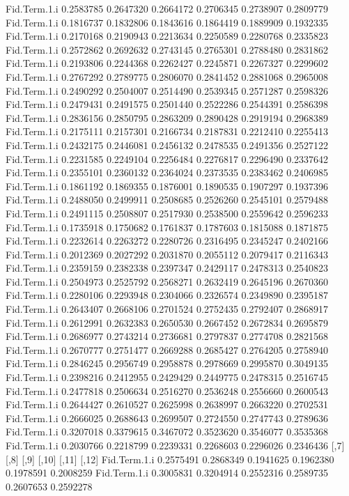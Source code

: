 \documentclass[11pt]{article} %
\begin{document}
\begin{Schunk}
\begin{Soutput}
Fid.Term.1.i 0.2583785 0.2647320 0.2664172 0.2706345 0.2738907 0.2809779
Fid.Term.1.i 0.1816737 0.1832806 0.1843616 0.1864419 0.1889909 0.1932335
Fid.Term.1.i 0.2170168 0.2190943 0.2213634 0.2250589 0.2280768 0.2335823
Fid.Term.1.i 0.2572862 0.2692632 0.2743145 0.2765301 0.2788480 0.2831862
Fid.Term.1.i 0.2193806 0.2244368 0.2262427 0.2245871 0.2267327 0.2299602
Fid.Term.1.i 0.2767292 0.2789775 0.2806070 0.2841452 0.2881068 0.2965008
Fid.Term.1.i 0.2490292 0.2504007 0.2514490 0.2539345 0.2571287 0.2598326
Fid.Term.1.i 0.2479431 0.2491575 0.2501440 0.2522286 0.2544391 0.2586398
Fid.Term.1.i 0.2836156 0.2850795 0.2863209 0.2890428 0.2919194 0.2968389
Fid.Term.1.i 0.2175111 0.2157301 0.2166734 0.2187831 0.2212410 0.2255413
Fid.Term.1.i 0.2432175 0.2446081 0.2456132 0.2478535 0.2491356 0.2527122
Fid.Term.1.i 0.2231585 0.2249104 0.2256484 0.2276817 0.2296490 0.2337642
Fid.Term.1.i 0.2355101 0.2360132 0.2364024 0.2373535 0.2383462 0.2406985
Fid.Term.1.i 0.1861192 0.1869355 0.1876001 0.1890535 0.1907297 0.1937396
Fid.Term.1.i 0.2488050 0.2499911 0.2508685 0.2526260 0.2545101 0.2579488
Fid.Term.1.i 0.2491115 0.2508807 0.2517930 0.2538500 0.2559642 0.2596233
Fid.Term.1.i 0.1735918 0.1750682 0.1761837 0.1787603 0.1815088 0.1871875
Fid.Term.1.i 0.2232614 0.2263272 0.2280726 0.2316495 0.2345247 0.2402166
Fid.Term.1.i 0.2012369 0.2027292 0.2031870 0.2055112 0.2079417 0.2116343
Fid.Term.1.i 0.2359159 0.2382338 0.2397347 0.2429117 0.2478313 0.2540823
Fid.Term.1.i 0.2504973 0.2525792 0.2568271 0.2632419 0.2645196 0.2670360
Fid.Term.1.i 0.2280106 0.2293948 0.2304066 0.2326574 0.2349890 0.2395187
Fid.Term.1.i 0.2643407 0.2668106 0.2701524 0.2752435 0.2792407 0.2868917
Fid.Term.1.i 0.2612991 0.2632383 0.2650530 0.2667452 0.2672834 0.2695879
Fid.Term.1.i 0.2686977 0.2743214 0.2736681 0.2797837 0.2774708 0.2821568
Fid.Term.1.i 0.2670777 0.2751477 0.2669288 0.2685427 0.2764205 0.2758940
Fid.Term.1.i 0.2846245 0.2956749 0.2958878 0.2978669 0.2995870 0.3049135
Fid.Term.1.i 0.2398216 0.2412955 0.2429429 0.2449775 0.2478315 0.2516745
Fid.Term.1.i 0.2477818 0.2506634 0.2516270 0.2536248 0.2556660 0.2600543
Fid.Term.1.i 0.2644427 0.2610527 0.2625998 0.2638997 0.2663220 0.2702531
Fid.Term.1.i 0.2666025 0.2688643 0.2699507 0.2724550 0.2747743 0.2789636
Fid.Term.1.i 0.3207018 0.3379615 0.3467072 0.3523620 0.3546077 0.3535368
Fid.Term.1.i 0.2030766 0.2218799 0.2239331 0.2268603 0.2296026 0.2346436
                  [,7]      [,8]      [,9]     [,10]     [,11]     [,12]
Fid.Term.1.i 0.2575491 0.2868349 0.1941625 0.1962380 0.1978591 0.2008259
Fid.Term.1.i 0.3005831 0.3204914 0.2552316 0.2589735 0.2607653 0.2592278

\end{Soutput}
\end{Schunk}
\end{document}
